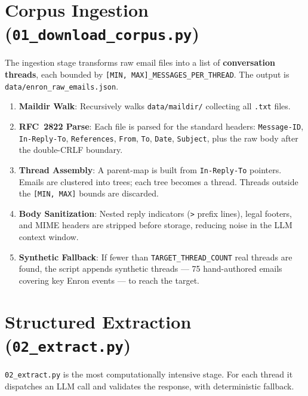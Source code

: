 \documentclass[12pt,a4paper]{article}
\begin{document}
\section{Corpus Ingestion (\texttt{01\_download\_corpus.py})}

The ingestion stage transforms raw email files into a list of \textbf{conversation threads}, each bounded by \texttt{[MIN, MAX]\_MESSAGES\_PER\_THREAD}. The output is \texttt{data/enron\_raw\_emails.json}.

\begin{enumerate}[label=\textbf{\arabic*.}]
    \item \textbf{Maildir Walk}: Recursively walks \texttt{data/maildir/} collecting all \texttt{.txt} files.
    \item \textbf{RFC~2822 Parse}: Each file is parsed for the standard headers: \texttt{Message-ID}, \texttt{In-Reply-To}, \texttt{References}, \texttt{From}, \texttt{To}, \texttt{Date}, \texttt{Subject}, plus the raw body after the double-CRLF boundary.
    \item \textbf{Thread Assembly}: A parent-map is built from \texttt{In-Reply-To} pointers. Emails are clustered into trees; each tree becomes a thread. Threads outside the \texttt{[MIN, MAX]} bounds are discarded.
    \item \textbf{Body Sanitization}: Nested reply indicators (\texttt{>} prefix lines), legal footers, and MIME headers are stripped before storage, reducing noise in the LLM context window.
    \item \textbf{Synthetic Fallback}: If fewer than \texttt{TARGET\_THREAD\_COUNT} real threads are found, the script appends synthetic threads — 75 hand-authored emails covering key Enron events — to reach the target.
\end{enumerate}

\section{Structured Extraction (\texttt{02\_extract.py})}

\texttt{02\_extract.py} is the most computationally intensive stage. For each thread it dispatches an LLM call and validates the response, with deterministic fallback.

\end{document}
